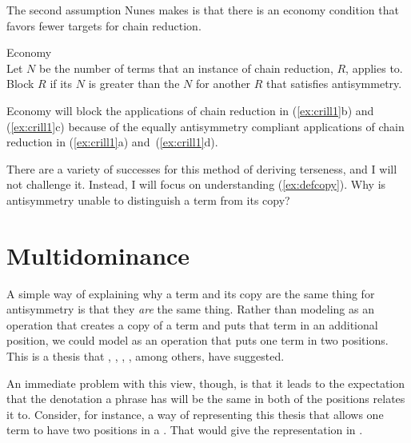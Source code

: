 \documentclass[output=paper]{langsci/langscibook}
\begin{document}
The second assumption Nunes makes is that there is an economy condition that favors fewer targets for chain reduction.
\begin{exe}
	\ex \label{ex:econ} Economy\\
	Let $N$ be the number of terms that an instance of chain reduction, $R$, applies to. Block $R$ if its $N$ is greater than the $N$ for another $R$ that satisfies antisymmetry.
\end{exe}

Economy will block the applications of chain reduction in (\ref{ex:crill1}b) and (\ref{ex:crill1}c) because of the equally antisymmetry compliant applications of chain reduction in (\ref{ex:crill1}a) and~(\ref{ex:crill1}d).

There are a variety of successes for this method of deriving terseness, and I
will not challenge it. Instead, I will focus on understanding
(\ref{ex:defcopy}). Why is antisymmetry unable to distinguish a term from its
copy?


\section{Multidominance} %
\label{sec:multidominance}

A simple way of explaining why a term and its copy are the same thing for
antisymmetry is that they \emph{are} the same thing. Rather than modeling
 as an operation that creates a copy
of a term and puts that term in an additional position, we could model
 as an operation that puts one term in two positions. This is a
thesis that \citet{Engdahl1980}, \citet{Starke2001}, \citet{deVries2007},
\citet{Gartner2002}, among others, have suggested.

An immediate problem with this view, though, is that it leads to the
expectation that the denotation a phrase has will be the same in both of the
positions  relates it to. Consider, for instance, a way of representing
this thesis that allows one term to have two positions in a . That
would give  the representation in .
\end{document}
